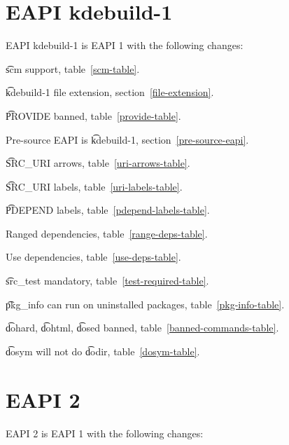 \IFKDEBUILDELSE
{
    \section*{EAPI kdebuild-1}

    EAPI kdebuild-1 is EAPI 1 with the following changes:

    \begin{compactitem}
    \item \t{scm} support, table~\ref{scm-table}.
    \item \t{kdebuild-1} file extension, section~\ref{file-extension}.
    \item \t{PROVIDE} banned, table~\ref{provide-table}.
    \item Pre-source EAPI is \t{kdebuild-1}, section~\ref{pre-source-eapi}.
    \item \t{SRC\_URI} arrows, table~\ref{uri-arrows-table}.
    \item \t{SRC\_URI} labels, table~\ref{uri-labels-table}.
    \item \t{PDEPEND} labels, table~\ref{pdepend-labels-table}.
    \item Ranged dependencies, table~\ref{range-deps-table}.
    \item Use dependencies, table~\ref{use-deps-table}.
    \item \t{src\_test} mandatory, table~\ref{test-required-table}.
    \item \t{pkg\_info} can run on uninstalled packages, table~\ref{pkg-info-table}.
    \item \t{dohard}, \t{dohtml}, \t{dosed} banned, table~\ref{banned-commands-table}.
    \item \t{dosym} will not do \t{dodir}, table~\ref{dosym-table}.
    \end{compactitem}
}{
}

\section*{EAPI 2}

EAPI 2 is EAPI 1 with the following changes:

